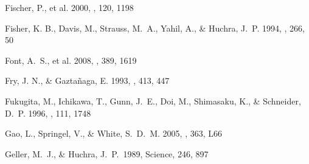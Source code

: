 \documentclass[]{emulateapj}
\begin{document}
\begin{thebibliography}{999}



Fischer, P., et al. 2000, \aj, 120, 1198

Fisher, K. B., Davis, M., Strauss, M.\ A., Yahil, A., \& Huchra, J.\ P. 1994,
\mnras, 266, 50

Font, A.\ S., et al. 2008, \mnras, 389, 1619


Fry, J. N., \& Gazta\~naga, E. 1993, \apj, 413, 447


Fukugita, M., Ichikawa, T., Gunn, J.\ E., Doi, M., Shimasaku, K., \&
Schneider, D.\ P. 1996, \aj, 111, 1748

Gao, L., Springel, V., \& White, S.\ D.\ M. 2005, 
\mnras, 363, L66 



Geller, M.~J., \& Huchra, J.~P.\ 1989, Science, 246, 897


\end{thebibliography}
\end{document}
